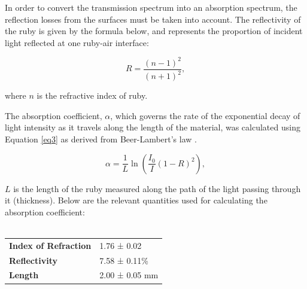 \documentclass[11pt, a4paper, twocolumn]{article}
\begin{document}
In order to convert the transmission spectrum into an absorption spectrum, the reflection losses from the surfaces must be taken into account. The reflectivity of the ruby is given by the formula below, and represents the proportion of incident light reflected at one ruby-air interface:

\begin{equation} \label{eq2}
    R=\frac{(n-1)^2}{(n+1)^2},
\end{equation}

where $n$ is the refractive index of ruby. 

The absorption coefficient, $\alpha$, which governs the rate of the exponential decay of light intensity as it travels along the length of the material, was calculated using Equation \ref{eq3} as derived from Beer-Lambert's law \cite{BeerLambert}.

\begin{equation}\label{eq3}
   \alpha = \frac{1}{L}\ln(\frac{I_0}{I}(1-R)^2),
\end{equation}

$L$ is the length of the ruby measured along the path of the light passing through it (thickness). Below are the relevant quantities used for calculating the absorption coefficient:
\\\\
\begin{tabular}{ll}
\textbf{Index of Refraction} & 1.76 ± 0.02 \cite{rubyRefraction}    \\
\textbf{Reflectivity}        & 7.58 ± 0.11\%  \\
\textbf{Length}              & 2.00 ± 0.05 mm  
\end{tabular}
\\
\end{document}
